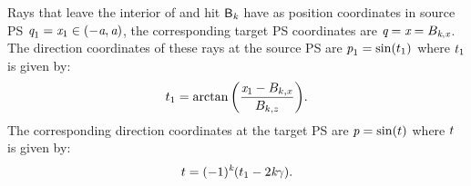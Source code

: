 Rays that leave the interior of  and hit $\textsf{B}_{\textit{k}}$ have as position coordinates in source PS $\textit{q}_1 = \textit{x}_1\in(-\textit{a}, \textit{a})$, the corresponding target PS coordinates are $\textit{q} = \textit{x} = B_{\textit{k}, \textit{x}}$.
The direction coordinates of these rays at the source PS are $\textit{p}_1 = \sin(t_1)$ where $t_1$ is given by:
\begin{equation}\label{anglesource}
t_1 = \arctan\bigg(\frac{\textit{x}_1-B_{k,x}}{B_{k,z}}\bigg).
\end{equation}
The corresponding direction coordinates at the target PS are $\textit{p}=\sin(t)$ where $t$ is given by:
\begin{equation}\label{teta}
t=(-1)^{\textit{k}}(t_1-2\textit{k}\gamma).
\end{equation}

